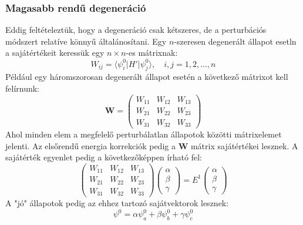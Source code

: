 \documentclass[../main.tex]{subfiles}
\begin{document}
\subsubsection*{Magasabb rendű degeneráció}
Eddig feltételeztük, hogy a degeneráció csak kétszeres, de a perturbációs módszert relatíve könnyű általánosítani. Egy $n$-szeresen degenerált állapot esetln a sajátértékeit keressük egy $n \times n$-es mátrixnak:
\begin{equation}
    W_{ij} = \langle \psi_i^0 | H' | \psi_j^0 \rangle, \quad i,j = 1,2,...,n
\end{equation}
Például egy háromszorosan degenerált állapot esetén a következő mátrixot kell felírnunk:
\begin{equation}
    \mathbf{W} = \begin{pmatrix}
        W_{11} & W_{12} & W_{13} \\
        W_{21} & W_{22} & W_{23} \\
        W_{31} & W_{32} & W_{33}
    \end{pmatrix}
\end{equation}
Ahol minden elem a megfelelő perturbálatlan állapotok közötti mátrixelemet jelenti. Az elsőrendű energia korrekciók pedig a $\mathbf{W}$ mátrix sajátértékei lesznek. A sajátérték egyenlet pedig a következőképpen írható fel:
\begin{equation}
    \begin{pmatrix}
        W_{11} & W_{12} & W_{13} \\
        W_{21} & W_{22} & W_{23} \\
        W_{31} & W_{32} & W_{33}
    \end{pmatrix} \begin{pmatrix}
        \alpha \\
        \beta \\
        \gamma
    \end{pmatrix} = E^1 \begin{pmatrix}
        \alpha \\
        \beta \\
        \gamma
    \end{pmatrix}
\end{equation}
A "jó" állapotok pedig az ehhez tartozó sajátvektorok lesznek:
\begin{equation}
    \psi^0 = \alpha \psi_a^0 + \beta \psi_b^0 + \gamma \psi_c^0
\end{equation}
\end{document}
